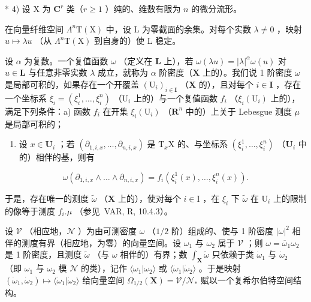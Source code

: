 * 4) 设 X 为 \(\mathbf{C}^r\) 类（\(r \geqslant 1\) ）纯的、维数有限为 \(n\) 的微分流形。

在向量纤维空间 \(\Lambda^{n}\mathrm{T}(\mathrm{X})\) 中，设 L 为零截面的余集。对每个实数 \(\lambda \neq 0\) ，映射 \(u \mapsto \lambda u\) （从 \(\Lambda^{n}\mathrm{T}(\mathrm{X})\) 到自身的）使 L 稳定。

设 \(\alpha\) 为复数。一个复值函数 \(\omega\) （定义在 \(\mathbf{L}\) 上），若 \(\omega (\lambda u) = |\lambda |^{\alpha}\omega (u)\) 对 \(u\in \mathbf{L}\) 与任意非零实数 \(\lambda\) 成立，就称为 \(\alpha\) 阶密度（\(\mathbf{X}\) 上的）。我们说 1 阶密度 \(\omega\) 是局部可积的，如果存在一个开覆盖 \((\mathrm{U}_i)_{i\in \mathbf{I}}\) （\(\mathbf{X}\) 的），且对每个 \(i\in \mathbf{I}\) ，存在一个坐标系 \(\xi_i = (\xi_i^1,\dots,\xi_i^n)\) （\(\mathrm{U}_i\) 上的）与一个复值函数 \(f_{i}\) （\(\xi_i(\mathrm{U}_i)\) 上的），满足下列条件：a) 函数 \(f_{i}\) 在开集 \(\xi_i(\mathrm{U}_i)\) （\(\mathbf{R}^n\) 中的）上关于 Lebesgue 测度 \(\mu\) 是局部可积的；

\begin{enumerate}
\def\labelenumi{\alph{enumi})}
\setcounter{enumi}{1}
\tightlist
\item
  设 \(x \in \mathbf{U}_i\) ；若 \((\partial_{1,i,x}, \ldots, \partial_{n,i,x})\) 是 \(\mathrm{T}_x\mathrm{X}\) 的、与坐标系 \((\xi_i^1, \ldots, \xi_i^n)\) （\(\mathbf{U}_i\) 中的）相伴的基，则有
\end{enumerate}

\[
\omega \left(\partial_ {1, i, x} \wedge \dots \wedge \partial_ {n, i, x}\right) = f _ {i} \left(\xi_ {i} ^ {1} (x), \dots , \xi_ {i} ^ {n} (x)\right).
\]

于是，存在唯一的测度 \(\tilde{\omega}\) （\(\mathbf{X}\) 上的），使对每个 \(i\in \mathrm{I}\) ，在 \(\xi_{i}\) 下 \(\tilde{\omega}\) 在 \(\mathrm{U}_i\) 上的限制的像等于测度 \(f_{i}.\mu\) （参见~VAR, R, 10.4.3）。

设 \(\mathcal{V}\) （相应地，\(\mathcal{N}\) ）为由可测密度 \(\omega\) （\(1/2\) 阶）组成的、使与 1 阶密度 \(|\omega|^2\) 相伴的测度有界（相应地，为零）的向量空间。设 \(\omega_1\) 与 \(\omega_2\) 属于 \(\mathcal{V}\) ；则 \(\omega = \overline{\omega}_1\omega_2\) 是 1 阶密度，且测度 \(\tilde{\omega}\) （与 \(\omega\) 相伴的）有界；数 \(\int_{\mathbf{X}}\tilde{\omega}\) 只依赖于类 \(\dot{\omega}_1\) 与 \(\dot{\omega}_2\) （即 \(\omega_1\) 与 \(\omega_2\) 模 \(\mathcal{N}\) 的类），记作 \(\langle\omega_1|\omega_2\rangle\) 或 \(\langle\dot{\omega}_1|\dot{\omega}_2\rangle\) 。于是映射 \((\dot{\omega}_1,\dot{\omega}_2)\mapsto\langle\dot{\omega}_1|\dot{\omega}_2\rangle\) 给向量空间 \(\Omega_{1/2}(\mathbf{X})=\mathcal{V}/\mathcal{N}_{*}\) 赋以一个复希尔伯特空间结构。


